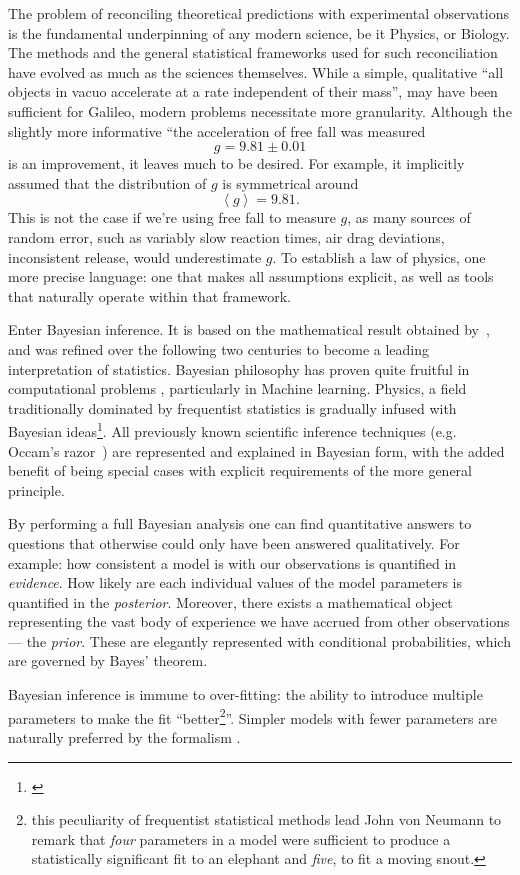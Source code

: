 \documentclass[usenatbib]{mnras}
\begin{document}
The problem of reconciling theoretical predictions with experimental
observations is the fundamental underpinning of any modern science,
be it Physics, or Biology. The methods and the general statistical
frameworks used for such reconciliation have evolved as much as the
sciences themselves. While a simple, qualitative ``all objects in
vacuo accelerate at a rate independent of their mass'', may have
been sufficient for Galileo, modern problems necessitate more
granularity. Although the slightly more informative ``the
acceleration of free fall was measured \[ g = 9.81 \pm 0.01\] is an
improvement, it leaves much to be desired. For example, it
implicitly assumed that the distribution of \(g\) is symmetrical
around \[ \left \langle g \right \rangle = 9.81.\] This is not the
case if we're using free fall to measure \(g\), as many sources of
random error, such as variably slow reaction times, air drag
deviations, inconsistent release, would underestimate \(g\).  To
establish a law of physics, one more precise language: one that
makes all assumptions explicit, as well as tools that naturally
operate within that framework.

Enter Bayesian inference. It is based on the mathematical result
obtained by~\cite{1763}, and was refined over the following two
centuries to become a leading interpretation of statistics. Bayesian
philosophy has proven quite fruitful in computational problems
\citep{Wolpert2004}, particularly in Machine learning. Physics, a
field traditionally dominated by frequentist statistics is gradually
infused with Bayesian ideas\footnote{\cite[see][]{xkcd}}. All previously
known scientific inference techniques (e.g. Occam's
razor~\cite[see][Chapter 28]{Occam}) are represented and explained in
Bayesian form, with the added benefit of being special cases with
explicit requirements of the more general principle.

By performing a full Bayesian analysis one can find quantitative
answers to questions that otherwise could only have been answered
qualitatively.  For example: how consistent a model is with our
observations is quantified in \emph{evidence}. How likely are each
individual values of the model parameters is quantified in the
\emph{posterior}. Moreover, there exists a mathematical object
representing the vast body of experience we have accrued from other
observations --- the \emph{prior}. These are elegantly represented with
conditional probabilities, which are governed by Bayes' theorem.

Bayesian inference is immune to over-fitting: the ability to
introduce multiple parameters to make the fit ``better\footnote{this
peculiarity of frequentist statistical methods lead John von Neumann
to remark that \emph{four} parameters in a model were sufficient to produce
a statistically significant fit to an elephant and \emph{five}, to fit a
moving snout.}''. Simpler models with fewer parameters are naturally
preferred by the formalism \citep[][Chapter 28]{Occam}.
\end{document}
